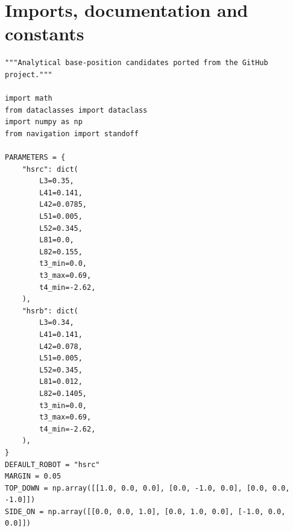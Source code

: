\documentclass[11pt,a4paper]{book}
\begin{document}
\section{Imports, documentation and constants}

\begin{lstlisting}[firstnumber=1]
"""Analytical base-position candidates ported from the GitHub project."""

import math
from dataclasses import dataclass
import numpy as np
from navigation import standoff

PARAMETERS = {
    "hsrc": dict(
        L3=0.35,
        L41=0.141,
        L42=0.0785,
        L51=0.005,
        L52=0.345,
        L81=0.0,
        L82=0.155,
        t3_min=0.0,
        t3_max=0.69,
        t4_min=-2.62,
    ),
    "hsrb": dict(
        L3=0.34,
        L41=0.141,
        L42=0.078,
        L51=0.005,
        L52=0.345,
        L81=0.012,
        L82=0.1405,
        t3_min=0.0,
        t3_max=0.69,
        t4_min=-2.62,
    ),
}
DEFAULT_ROBOT = "hsrc"
MARGIN = 0.05
TOP_DOWN = np.array([[1.0, 0.0, 0.0], [0.0, -1.0, 0.0], [0.0, 0.0, -1.0]])
SIDE_ON = np.array([[0.0, 0.0, 1.0], [0.0, 1.0, 0.0], [-1.0, 0.0, 0.0]])


\end{lstlisting}
\end{document}
